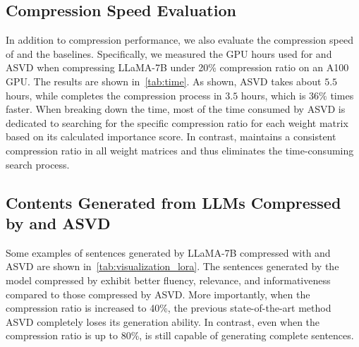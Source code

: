 \subsection{Compression Speed Evaluation}
\label{appendix:compression_speed}
In addition to compression performance, we also evaluate the compression speed of \sysname and the baselines. Specifically, we measured the GPU hours used for \sysname and ASVD when compressing LLaMA-7B under 20\% compression ratio on an A100 GPU. The results are shown in~\cref{tab:time}. As shown, ASVD takes about $5.5$ hours, while \sysname completes the compression process in $3.5$ hours, which is $36\%$ times faster. When breaking down the time, most of the time consumed by ASVD is dedicated to searching for the specific compression ratio for each weight matrix based on its calculated importance score. In contrast, \sysname maintains a consistent compression ratio in all weight matrices and thus eliminates the time-consuming search process.

\subsection{Contents Generated from LLMs Compressed by \sysname and ASVD}
\label{sec:appendix_example}
Some examples of sentences generated by LLaMA-7B compressed with \sysname and ASVD are shown in~\cref{tab:visualization_lora}. 
%
The sentences generated by the model compressed by \sysname exhibit better fluency, relevance, and informativeness compared to those compressed by ASVD. More importantly, when the compression ratio is increased to 40\%, the previous state-of-the-art method ASVD completely loses its generation ability. 
In contrast, even when the compression ratio is up to 80\%, \sysname is still capable of generating complete sentences.
\exampleLoraTable







